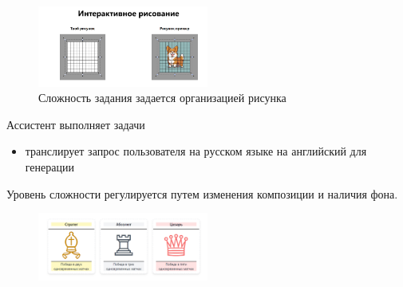\begin{figure}[h]
    \centering
    \includegraphics[width=0.5\textwidth]{assets/work/games/interface.excalidraw.png}
    \caption{Сложность задания задается организацией рисунка}
    \label{draw}
\end{figure}


Ассистент выполняет задачи \begin{itemize}
    \item транслирует запрос пользователя на русском языке на английский для генерации
\end{itemize}



Уровень сложности регулируется путем изменения композиции и наличия фона.




\begin{figure}[h]
    \centering
    \includegraphics[width=0.5\textwidth]{assets/work/games/achieve.png}
    \caption{}
    \label{chess}
\end{figure}








